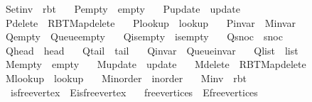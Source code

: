 \begin{isabellebody}
\ \ Set{\isacharunderscore}{\kern0pt}inv\ {\isacharequal}{\kern0pt}\ rbt\ \isanewline
\ \ P{\isacharunderscore}{\kern0pt}empty\ {\isacharequal}{\kern0pt}\ empty\ \isanewline
\ \ P{\isacharunderscore}{\kern0pt}update\ {\isacharequal}{\kern0pt}\ update\ \isanewline
\ \ P{\isacharunderscore}{\kern0pt}delete\ {\isacharequal}{\kern0pt}\ RBT{\isacharunderscore}{\kern0pt}Map{\isachardot}{\kern0pt}delete\ \isanewline
\ \ P{\isacharunderscore}{\kern0pt}lookup\ {\isacharequal}{\kern0pt}\ lookup\ \isanewline
\ \ P{\isacharunderscore}{\kern0pt}invar\ {\isacharequal}{\kern0pt}\ M{\isachardot}{\kern0pt}invar\ \isanewline
\ \ Q{\isacharunderscore}{\kern0pt}empty\ {\isacharequal}{\kern0pt}\ Queue{\isachardot}{\kern0pt}empty\ \isanewline
\ \ Q{\isacharunderscore}{\kern0pt}is{\isacharunderscore}{\kern0pt}empty\ {\isacharequal}{\kern0pt}\ is{\isacharunderscore}{\kern0pt}empty\ \isanewline
\ \ Q{\isacharunderscore}{\kern0pt}snoc\ {\isacharequal}{\kern0pt}\ snoc\ \isanewline
\ \ Q{\isacharunderscore}{\kern0pt}head\ {\isacharequal}{\kern0pt}\ head\ \isanewline
\ \ Q{\isacharunderscore}{\kern0pt}tail\ {\isacharequal}{\kern0pt}\ tail\ \isanewline
\ \ Q{\isacharunderscore}{\kern0pt}invar\ {\isacharequal}{\kern0pt}\ Queue{\isachardot}{\kern0pt}invar\ \isanewline
\ \ Q{\isacharunderscore}{\kern0pt}list\ {\isacharequal}{\kern0pt}\ list\ \isanewline
\ \ M{\isacharunderscore}{\kern0pt}empty\ {\isacharequal}{\kern0pt}\ empty\ \isanewline
\ \ M{\isacharunderscore}{\kern0pt}update\ {\isacharequal}{\kern0pt}\ update\ \isanewline
\ \ M{\isacharunderscore}{\kern0pt}delete\ {\isacharequal}{\kern0pt}\ RBT{\isacharunderscore}{\kern0pt}Map{\isachardot}{\kern0pt}delete\ \isanewline
\ \ M{\isacharunderscore}{\kern0pt}lookup\ {\isacharequal}{\kern0pt}\ lookup\ \isanewline
\ \ M{\isacharunderscore}{\kern0pt}inorder\ {\isacharequal}{\kern0pt}\ inorder\ \isanewline
\ \ M{\isacharunderscore}{\kern0pt}inv\ {\isacharequal}{\kern0pt}\ rbt\isanewline
\ \ \ is{\isacharunderscore}{\kern0pt}free{\isacharunderscore}{\kern0pt}vertex\ {\isacharequal}{\kern0pt}\ E{\isachardot}{\kern0pt}is{\isacharunderscore}{\kern0pt}free{\isacharunderscore}{\kern0pt}vertex\isanewline
\ \ \ free{\isacharunderscore}{\kern0pt}vertices\ {\isacharequal}{\kern0pt}\ E{\isachardot}{\kern0pt}free{\isacharunderscore}{\kern0pt}vertices\isanewline

\end{isabellebody}
